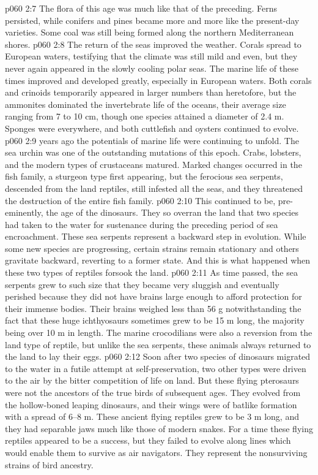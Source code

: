 \vs p060 2:7 The flora of this age was much like that of the preceding. Ferns persisted, while conifers and pines became more and more like the present\hyp{}day varieties. Some coal was still being formed along the northern Mediterranean shores.
\vs p060 2:8 The return of the seas improved the weather. Corals spread to European waters, testifying that the climate was still mild and even, but they never again appeared in the slowly cooling polar seas. The marine life of these times improved and developed greatly, especially in European waters. Both corals and crinoids temporarily appeared in larger numbers than heretofore, but the ammonites dominated the invertebrate life of the oceans, their average size ranging from 7 to 10 cm, though one species attained a diameter of 2.4 m. Sponges were everywhere, and both cuttlefish and oysters continued to evolve.
\vs p060 2:9 \pc {} years ago the potentials of marine life were continuing to unfold. The sea urchin was one of the outstanding mutations of this epoch. Crabs, lobsters, and the modern types of crustaceans matured. Marked changes occurred in the fish family, a sturgeon type first appearing, but the ferocious sea serpents, descended from the land reptiles, still infested all the seas, and they threatened the destruction of the entire fish family.
\vs p060 2:10 This continued to be, pre\hyp{}eminently, the age of the dinosaurs. They so overran the land that two species had taken to the water for sustenance during the preceding period of sea encroachment. These sea serpents represent a backward step in evolution. While some new species are progressing, certain strains remain stationary and others gravitate backward, reverting to a former state. And this is what happened when these two types of reptiles forsook the land.
\vs p060 2:11 As time passed, the sea serpents grew to such size that they became very sluggish and eventually perished because they did not have brains large enough to afford protection for their immense bodies. Their brains weighed less than 56 g notwithstanding the fact that these huge ichthyosaurs sometimes grew to be 15 m long, the majority being over 10 m in length. The marine crocodilians were also a reversion from the land type of reptile, but unlike the sea serpents, these animals always returned to the land to lay their eggs.
\vs p060 2:12 Soon after two species of dinosaurs migrated to the water in a futile attempt at self\hyp{}preservation, two other types were driven to the air by the bitter competition of life on land. But these flying pterosaurs were not the ancestors of the true birds of subsequent ages. They evolved from the hollow\hyp{}boned leaping dinosaurs, and their wings were of batlike formation with a spread of 6--8 m. These ancient flying reptiles grew to be 3 m long, and they had separable jaws much like those of modern snakes. For a time these flying reptiles appeared to be a success, but they failed to evolve along lines which would enable them to survive as air navigators. They represent the nonsurviving strains of bird ancestry.
